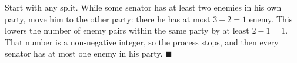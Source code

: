 Start with any split. While some senator has at least two enemies in his own party, move him to the other party: there he has at most $3-2=1$ enemy. This lowers the number of enemy pairs within the same party by at least $2-1=1$. That number is a non-negative integer, so the process stops, and then every senator has at most one enemy in his party. $\blacksquare$

